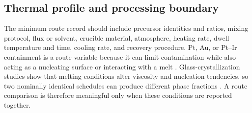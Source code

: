 \subsection{Thermal profile and processing boundary}

The minimum route record should include precursor identities and ratios, mixing protocol, flux or solvent, crucible material, atmosphere, heating rate, dwell temperature and time, cooling rate, and recovery procedure. Pt, Au, or Pt--Ir containment is a route variable because it can limit contamination while also acting as a nucleating surface or interacting with a melt \cite{thieme2022noble,abdeyazdan2024phase,abdeyazdan2023experimental}. Glass-crystallization studies show that melting conditions alter viscosity and nucleation tendencies, so two nominally identical schedules can produce different phase fractions \cite{jensen2026impact,hu2025crystallization,shaaban2021thermal}. A route comparison is therefore meaningful only when these conditions are reported together.
